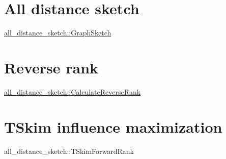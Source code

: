 \hypertarget{Overview_ADS}{}\section{All distance sketch}\label{Overview_ADS}
\hyperlink{classall__distance__sketch_1_1GraphSketch}{all\+\_\+distance\+\_\+sketch\+::\+Graph\+Sketch}\hypertarget{Overview_RRank}{}\section{Reverse rank}\label{Overview_RRank}
\hyperlink{namespaceall__distance__sketch_a025f777de5a9df1594dd306f9037f385}{all\+\_\+distance\+\_\+sketch\+::\+Calculate\+Reverse\+Rank}\hypertarget{Overview_TSkim}{}\section{T\+Skim influence maximization}\label{Overview_TSkim}
all\+\_\+distance\+\_\+sketch\+::\+T\+Skim\+Forward\+Rank 